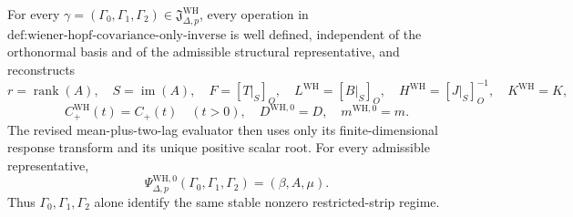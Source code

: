 For every \(\gamma=(\Gamma_0,\Gamma_1,\Gamma_2)\in\mathfrak J_{\Delta,p}^{\mathrm{WH}}\), every operation in \(\text{def:wiener-hopf-covariance-only-inverse}\) is well defined, independent of the orthonormal basis and of the admissible structural representative, and reconstructs
\[
 r=\operatorname{rank}(A),\quad S=\operatorname{im}(A),\quad
 F=[T|_S]_O,\quad L^{\mathrm{WH}}=[B|_S]_O,\quad
 H^{\mathrm{WH}}=[J|_S]_O^{-1},\quad K^{\mathrm{WH}}=K,
\]
\[
 C_{+}^{\mathrm{WH}}(t)=C_{+}(t)\quad(t>0),\quad
 D^{\mathrm{WH},0}=D,\quad
 m^{\mathrm{WH},0}=m.
\]
The revised mean-plus-two-lag evaluator then uses only its finite-dimensional response transform and its unique positive scalar root.  For every admissible representative,
\[
 \Psi_{\Delta,p}^{\mathrm{WH},0}(\Gamma_0,\Gamma_1,\Gamma_2)
 =(\beta,A,\mu).
\]
Thus \(\Gamma_0,\Gamma_1,\Gamma_2\) alone identify the same stable nonzero restricted-strip regime.